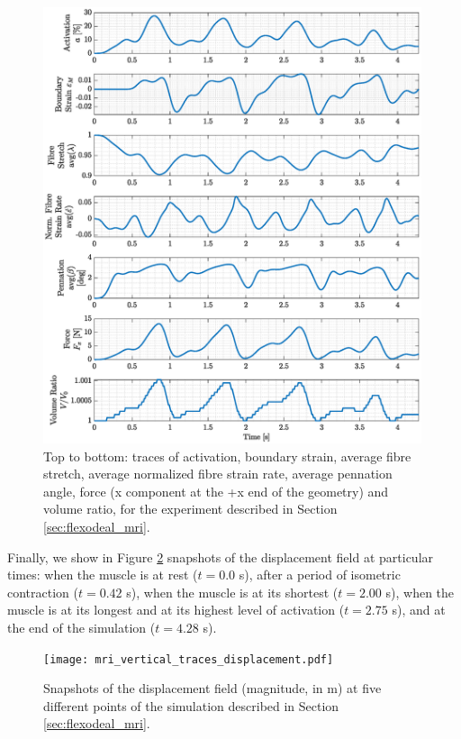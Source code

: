 \documentclass{sfuthesis}
\numberwithin{equation}{section}
\numberwithin{figure}{chapter}
\numberwithin{table}{chapter}
\theoremstyle{definition}
\begin{document}
\begin{figure}
    \centering
    \includegraphics[width=0.99\textwidth]{mri_traces.eps}
    \caption{Top to bottom: traces of activation, boundary strain, average fibre stretch, average normalized fibre strain rate, average pennation angle, force (x component at the +x end of the geometry) and volume ratio, for the experiment described in Section \ref{sec:flexodeal_mri}.
    \label{fig:mri_traces}}
\end{figure}

Finally, we show in Figure \ref{fig:mri_displacement_3d} snapshots of the displacement field at particular times: when the muscle is at rest ($t = 0.0$ s), after a period of isometric contraction ($t = 0.42$ s), when the muscle is at its shortest ($t = 2.00$ s), when the muscle is at its longest and at its highest level of activation ($t = 2.75$ s), and at the end of the simulation ($t = 4.28$ s).

\begin{figure}
    \centering
    \texttt{[image: mri\_vertical\_traces\_displacement.pdf]}
    \caption{Snapshots of the displacement field (magnitude, in m) at five different points of the simulation described in Section \ref{sec:flexodeal_mri}.
    \label{fig:mri_displacement_3d}}
\end{figure}
\end{document}
